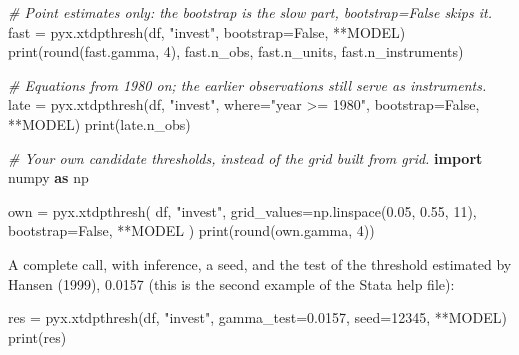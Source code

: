 \documentclass[
  10.5pt,
  a4paper,
]{article}
\newenvironment{Shaded}{}{}
\newcommand{\BuiltInTok}[1]{\textcolor[rgb]{0.00,0.50,0.00}{#1}}
\newcommand{\CommentTok}[1]{\textcolor[rgb]{0.38,0.63,0.69}{\textit{#1}}}
\newcommand{\DecValTok}[1]{\textcolor[rgb]{0.25,0.63,0.44}{#1}}
\newcommand{\FloatTok}[1]{\textcolor[rgb]{0.25,0.63,0.44}{#1}}
\newcommand{\ImportTok}[1]{\textcolor[rgb]{0.00,0.50,0.00}{\textbf{#1}}}
\newcommand{\NormalTok}[1]{#1}
\newcommand{\OperatorTok}[1]{\textcolor[rgb]{0.40,0.40,0.40}{#1}}
\newcommand{\StringTok}[1]{\textcolor[rgb]{0.25,0.44,0.63}{#1}}
\newcommand{\VariableTok}[1]{\textcolor[rgb]{0.10,0.09,0.49}{#1}}
\begin{document}
\begin{Shaded}
\begin{Highlighting}[]
\CommentTok{\# Point estimates only: the bootstrap is the slow part, bootstrap=False skips it.}
\NormalTok{fast }\OperatorTok{=}\NormalTok{ pyx.xtdpthresh(df, }\StringTok{"invest"}\NormalTok{, bootstrap}\OperatorTok{=}\VariableTok{False}\NormalTok{, }\OperatorTok{**}\NormalTok{MODEL)}
\BuiltInTok{print}\NormalTok{(}\BuiltInTok{round}\NormalTok{(fast.gamma, }\DecValTok{4}\NormalTok{), fast.n\_obs, fast.n\_units, fast.n\_instruments)}

\CommentTok{\# Equations from 1980 on; the earlier observations still serve as instruments.}
\NormalTok{late }\OperatorTok{=}\NormalTok{ pyx.xtdpthresh(df, }\StringTok{"invest"}\NormalTok{, where}\OperatorTok{=}\StringTok{"year \textgreater{}= 1980"}\NormalTok{, bootstrap}\OperatorTok{=}\VariableTok{False}\NormalTok{, }\OperatorTok{**}\NormalTok{MODEL)}
\BuiltInTok{print}\NormalTok{(late.n\_obs)}

\CommentTok{\# Your own candidate thresholds, instead of the grid built from \textasciigrave{}grid\textasciigrave{}.}
\ImportTok{import}\NormalTok{ numpy }\ImportTok{as}\NormalTok{ np}

\NormalTok{own }\OperatorTok{=}\NormalTok{ pyx.xtdpthresh(}
\NormalTok{    df, }\StringTok{"invest"}\NormalTok{, grid\_values}\OperatorTok{=}\NormalTok{np.linspace(}\FloatTok{0.05}\NormalTok{, }\FloatTok{0.55}\NormalTok{, }\DecValTok{11}\NormalTok{), bootstrap}\OperatorTok{=}\VariableTok{False}\NormalTok{, }\OperatorTok{**}\NormalTok{MODEL}
\NormalTok{)}
\BuiltInTok{print}\NormalTok{(}\BuiltInTok{round}\NormalTok{(own.gamma, }\DecValTok{4}\NormalTok{))}
\end{Highlighting}
\end{Shaded}

A complete call, with inference, a seed, and the test of the threshold
estimated by Hansen (1999), 0.0157 (this is the second example of the
Stata help file):

\begin{Shaded}
\begin{Highlighting}[]
\NormalTok{res }\OperatorTok{=}\NormalTok{ pyx.xtdpthresh(df, }\StringTok{"invest"}\NormalTok{, gamma\_test}\OperatorTok{=}\FloatTok{0.0157}\NormalTok{, seed}\OperatorTok{=}\DecValTok{12345}\NormalTok{, }\OperatorTok{**}\NormalTok{MODEL)}
\BuiltInTok{print}\NormalTok{(res)}
\end{Highlighting}
\end{Shaded}
\end{document}
